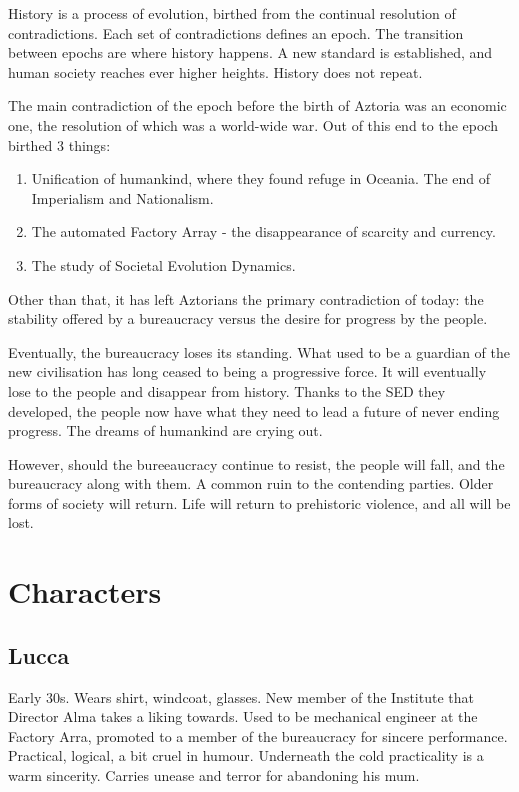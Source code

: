 \documentclass[11pt]{article}
\begin{document}
	History is a process of evolution, birthed from the continual resolution of contradictions. 
	Each set of contradictions defines an epoch.
	The transition between epochs are where history happens.
	A new standard is established, and human society reaches ever higher heights. History does not repeat.
	
	The main contradiction of the epoch before the birth of Aztoria was an economic one, the resolution of which was a world-wide war.
	Out of this end to the epoch birthed 3 things:
	
	\begin{enumerate}
		\item Unification of humankind, where they found refuge in Oceania. The end of Imperialism and Nationalism.
		\item The automated Factory Array - the disappearance of scarcity and currency.
		\item The study of Societal Evolution Dynamics.
	\end{enumerate}
	
	Other than that, it has left Aztorians the primary contradiction of today: the stability offered by a bureaucracy versus the desire for progress by the people.
	
	Eventually, the bureaucracy loses its standing. 
	What used to be a guardian of the new civilisation has long ceased to being a progressive force. 
	It will eventually lose to the people and disappear from history. 
	Thanks to the SED they developed, the people now have what they need to lead a future of never ending progress.
	The dreams of humankind are crying out.
	
	However, should the bureeaucracy continue to resist, the people will fall, and the bureaucracy along with them. 
	A common ruin to the contending parties.
	Older forms of society will return. 
	Life will return to prehistoric violence, and all will be lost.
\newpage






\section{Characters}
	\subsection{Lucca}
	Early 30s. Wears shirt, windcoat, glasses.
	New member of the Institute that Director Alma takes a liking towards.
	Used to be mechanical engineer at the Factory Arra, promoted to a member of the bureaucracy for sincere performance.
	Practical, logical, a bit cruel in humour. 
	Underneath the cold practicality is a warm sincerity.
	Carries unease and terror for abandoning his mum.
\end{document}
